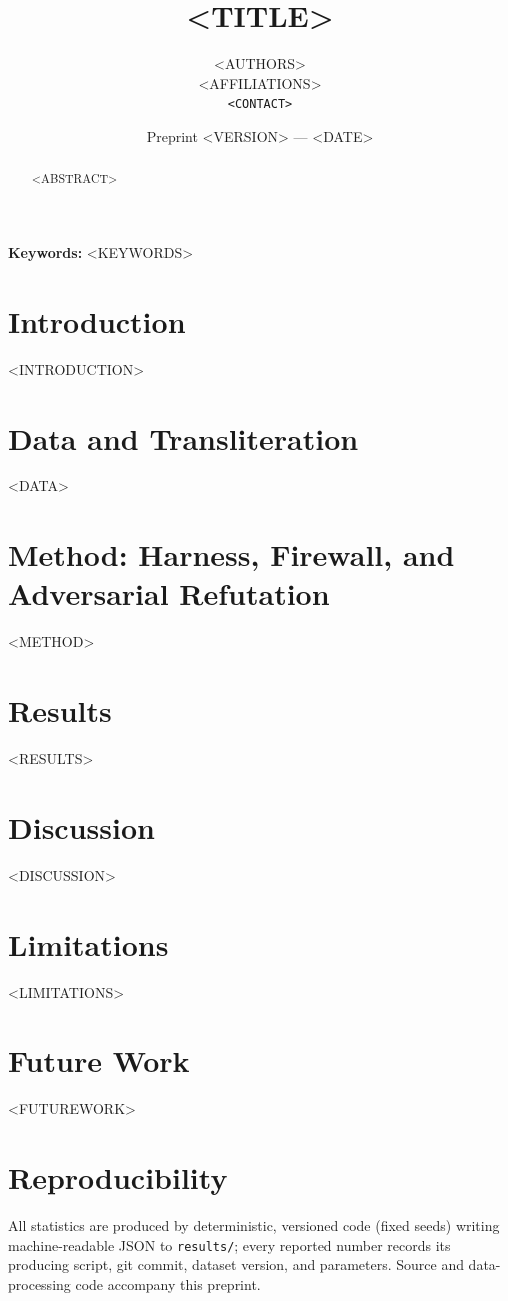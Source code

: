 \documentclass[11pt]{article}
\title{\textbf{<TITLE>}}
\author{<AUTHORS> \\ \small <AFFILIATIONS> \\ \small \texttt{<CONTACT>}}
\date{Preprint <VERSION> --- <DATE>}
\begin{document}
\maketitle

\begin{abstract}
\noindent <ABSTRACT>
\end{abstract}

\noindent\textbf{Keywords:} <KEYWORDS>

\section{Introduction}
<INTRODUCTION>

\section{Data and Transliteration}
<DATA>

\section{Method: Harness, Firewall, and Adversarial Refutation}
<METHOD>

\section{Results}
<RESULTS>

\section{Discussion}
<DISCUSSION>

\section{Limitations}
<LIMITATIONS>

\section{Future Work}
<FUTUREWORK>

\section*{Reproducibility}
All statistics are produced by deterministic, versioned code (fixed seeds) writing
machine-readable JSON to \texttt{results/}; every reported number records its
producing script, git commit, dataset version, and parameters. Source and data-
processing code accompany this preprint.



\end{document}
